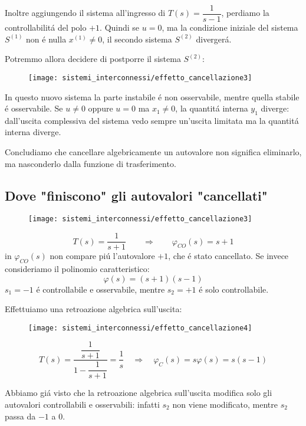 \documentclass[../main.tex]{subfiles}
\begin{document}
		Inoltre aggiungendo il sistema all'ingresso di $ T(s)=\dfrac{1}{s-1} $, perdiamo la controllabilit\'a del polo $ +1 $. Quindi se $ u = 0 $, ma la condizione iniziale del sistema $ S^{(1)} $ non \'e nulla $ x^{(1)} \neq 0 $, il secondo sistema $ S^{(2)} $ diverger\'a.
		
		Potremmo allora decidere di postporre il sistema $ S^{(2)} $:
		\begin{figure}[h!]
			\centering\texttt{[image: sistemi\_interconnessi/effetto\_cancellazione3]}
			\label{fig:effetto_cancellazione3}
		\end{figure}
	
		In questo nuovo sistema la parte instabile \'e non osservabile, mentre quella stabile \'e osservabile. Se $ u \neq 0 $ oppure $ u = 0 $ ma $ x_1 \neq 0 $, la quantit\'a interna $ y_1 $ diverge: dall'uscita complessiva del sistema vedo sempre un'uscita limitata ma la quantit\'a interna diverge.
		
		Concludiamo che cancellare algebricamente un autovalore non significa eliminarlo, ma nasconderlo dalla funzione di trasferimento.
		
	\subsection{Dove "finiscono" gli autovalori "cancellati"}
		\begin{figure}[h!]
			\centering\texttt{[image: sistemi\_interconnessi/effetto\_cancellazione3]}
		\end{figure}
		\[
			T(s) = \dfrac{1}{s+1}
			\qquad\Rightarrow\qquad
			\varphi_{CO}(s)=s+1
		\]
		in $ \varphi_{CO}(s) $ non compare pi\'u l'autovalore $ +1 $, che \'e stato cancellato. Se invece consideriamo il polinomio caratteristico:
		\[
			\varphi(s)=(s+1)(s-1)
		\]
		$ s_1 = -1 $ \'e controllabile e osservabile, mentre $ s_2 = +1 $ \'e solo controllabile.
		
		Effettuiamo una retroazione algebrica sull'uscita:
		\begin{figure}[h!]
			\centering\texttt{[image: sistemi\_interconnessi/effetto\_cancellazione4]}
		\end{figure}
		
		\[
			T(s)=\dfrac{\dfrac{1}{s+1}}{1-\dfrac{1}{s+1}} = \dfrac{1}{s} \quad\Rightarrow\quad \varphi_C(s)=s \varphi(s)=s(s-1)
		\]
		
		Abbiamo gi\'a visto che la retroazione algebrica sull'uscita modifica solo gli autovalori controllabili e osservabili: infatti $ s_2 $ non viene modificato, mentre $ s_2 $ passa da $ -1 $ a $ 0 $.
		
		\begin{center}
		\end{center}
		
\end{document}

